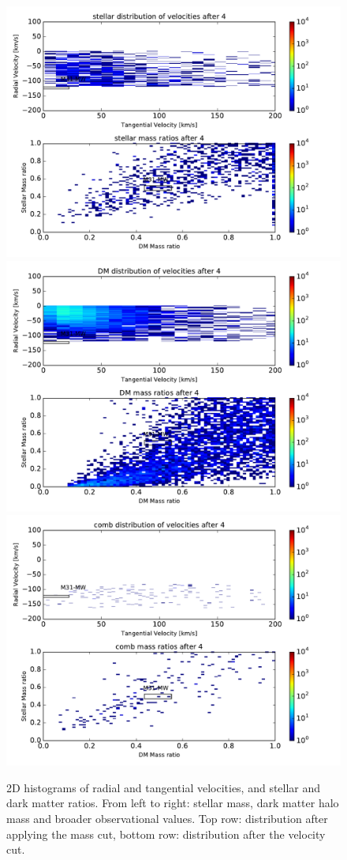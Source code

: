 \documentclass[fleqn,usenatbib]{mnras}
\begin{document}
\begin{figure}
\includegraphics[scale=0.27]{avgProp/stellar_2Dhists_4.pdf}
\includegraphics[scale=0.27]{avgProp/DM_2Dhists_4.pdf}
\includegraphics[scale=0.27]{avgProp/comb_2Dhists_4.pdf}
\caption{\label{fig:2d_vels_ratios} 2D histograms of radial and tangential velocities, and stellar and dark matter ratios. From left to right: stellar mass, dark matter halo mass and broader observational values. Top row: distribution after applying the mass cut, bottom row: distribution after the velocity cut.}
\end{figure}
\end{document}
